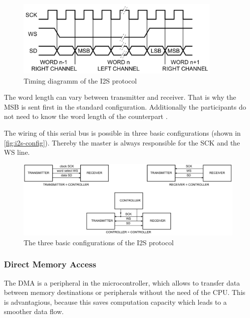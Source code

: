 \begin{figure}[!h]
    \centering
    \includegraphics[width=10cm]{img/i2s_timing.png}
    \caption{Timing diagramm of the \ac{I2S} protocol \cite{nxp_i2s}}
    \label{fig:i2s-timing}
\end{figure}

The word length can vary between transmitter and receiver. That is why the \ac{MSB} is sent first in the standard 
configuration. Additionally the participants do not need to know the word length of the counterpart \cite{nxp_i2s}.

The wiring of this serial bus is possible in three basic configurations (shown in \autoref{fig:i2s-config}).
Thereby the master is always responsible for the SCK and the WS line.

\begin{figure}[!h]
    \centering
    \includegraphics[width=14cm]{img/i2s_config.png}
    \caption{The three basic configurations of the \ac{I2S} protocol \cite{nxp_i2s}}
    \label{fig:i2s-config}
\end{figure}

\subsubsection{Direct Memory Access}
\label{sec:dma}

The \ac{DMA} is a peripheral in the microcontroller, which allows to transfer data between memory destinations or
peripherals without the need of the \ac{CPU}.
This is advantagious, because this saves computation capacity which leads to a smoother data flow.

